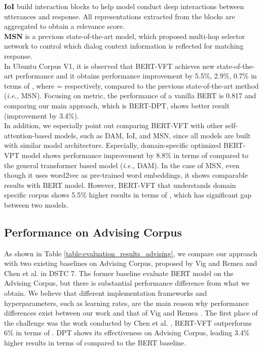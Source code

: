 \documentclass[a4paper]{article}
\begin{document}
\textbf{IoI} \cite{tao2019one} build interaction blocks to help model conduct deep interactions between utterances and response. All representations extracted from the blocks are aggregated to obtain a relevance score.\\
\textbf{MSN} \cite{yuan2019multi} is a previous state-of-the-art model, which proposed multi-hop selector network to control which dialog context information is reflected for matching response. \\
\indent In Ubuntu Corpus V1, it is observed that BERT-VFT achieves new state-of-the-art performance and it obtains performance improvement by 5.5\%, 2.9\%, 0.7\% in terms of , where = respectively, compared to the previous state-of-the-art method ({\em{i.e.,}} MSN). Focusing on  metric, the performance of a vanilla BERT is 0.817 and comparing our main approach, which is BERT-DPT, shows better result (improvement by 3.4\%). \\
\indent In addition, we especially point out comparing BERT-VFT with other self-attention-based models, such as DAM, IoI, and MSN, since all models are built with similar model architecture. Especially, domain-specific optimized BERT-VPT model shows performance improvement by 8.8\% in terms of  compared to the general transformer based model ({\em{i.e.,}} DAM). In the case of MSN, even though it uses word2vec \cite{mikolov2013distributed} as pre-trained word embeddings, it shows comparable results with BERT model. However, BERT-VFT that understands domain specific corpus shows 5.5\% higher results in terms of , which has significant gap between two models.

\subsection{Performance on Advising Corpus}

As shown in Table \ref{table:evaluation_results_advising}, we compare our approach with two existing baselines on Advising Corpus, proposed by Vig and Remea  \cite{vig2019comparison} and Chen et al. \cite{chen2019sequential} in DSTC 7. The former baseline evaluate BERT model on the Advising Corpus, but there is substantial performance difference from what we obtain. We believe that different implementation frameworks and hyperparameters, such as learning rates, are the main reason why performance differences exist between our work and that of Vig and Remea \cite{vig2019comparison}. The first place of the challenge was the work conducted by Chen et al. \cite{chen2019sequential}, BERT-VFT outperforms 6\% in terms of . DPT shows its effectiveness on Advising Corpus, leading 3.4\% higher results in terms of  compared to the BERT baseline. 
\end{document}
